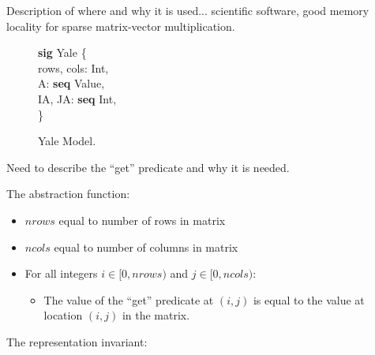 \documentclass[11pt,conference]{IEEEtran}
\newenvironment{myquote}{\list{}{\leftmargin=12pt\rightmargin=0pt}\item[]}{\endlist}
\def\TA{\makebox[12pt]{}}
\def\Bsig{\textbf{sig} }
\def\Bseq{\textbf{seq} }
\begin{document}
\begin{figure}
\end{figure}

Description of where and why it is used... scientific software, good memory locality for sparse matrix-vector multiplication.

\begin{figure}
\centering
\begin{myquote}
\Bsig Yale \{\\
\TA  rows, cols: Int,\\
\TA  A: \Bseq Value,\\
\TA  IA, JA: \Bseq Int,\\
\}
\end{myquote}
\caption{Yale Model.}
\label{model:yale}
\end{figure}

Need to describe the ``get'' predicate and why it is needed.

The abstraction function:

\begin{itemize}
  \item \(nrows\) equal to number of rows in matrix
  \item \(ncols\) equal to number of columns in matrix
  \item For all integers \(i \in [0, nrows)\) and \(j \in [0, ncols)\):
  \begin{itemize}
    \item The value of the ``get'' predicate at \((i, j)\) is equal to the value at location \((i, j)\) in the matrix.
  \end{itemize}
\end{itemize}

The representation invariant:
\end{document}
